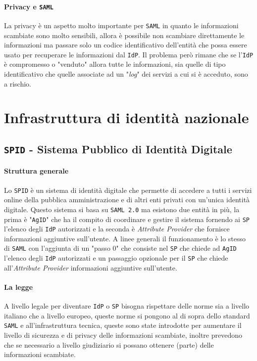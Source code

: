         \paragraph{Privacy e \texttt{SAML}} La privacy è un aspetto molto importante per \texttt{SAML} in quanto le informazioni scambiate sono molto sensibili, allora è possibile non scambiare direttamente le informazioni ma passare solo un codice identificativo dell'entità che possa essere usato per recuperare le informazioni dal \texttt{IdP}. Il problema però rimane che se l'\texttt{IdP} è compromesso o "venduto" allora tutte le informazioni, sia quelle di tipo identificativo che quelle associate ad un "\textit{log}" dei servizi a cui si è acceduto, sono a rischio.
\section{Infrastruttura di identità nazionale}
    \subsection{\texttt{SPID} - Sistema Pubblico di Identità Digitale}
        \paragraph{Struttura generale} Lo \texttt{SPID} è un sistema di identità digitale che permette di accedere a tutti i servizi online della pubblica amministrazione e di altri enti privati con un'unica identità digitale. Questo sistema si basa su \texttt{SAML 2.0} ma esistono due entità in più, la prima è "\texttt{AgID}" che ha il compito di coordinare e gestire il sistema fornendo ai \texttt{SP} l'elenco degli \texttt{IdP} autorizzati e la seconda è \textit{Attribute Provider} che fornisce informazioni aggiuntive sull'utente. A linee generali il funzionamento è lo stesso di \texttt{SAML} con l'aggiunta di un "passo 0" che consiste nel \texttt{SP} che chiede ad \texttt{AgID} l'elenco degli \texttt{IdP} autorizzati e un passaggio opzionale per il \texttt{SP} che chiede all'\textit{Attribute Provider} informazioni aggiuntive sull'utente.
        \paragraph{La legge} A livello legale per diventare \texttt{IdP} o \texttt{SP} bisogna rispettare delle norme sia a livello italiano che a livello europeo, queste norme si pongono al di sopra dello standard \texttt{SAML} e all'infrastruttura tecnica, queste sono state introdotte per aumentare il livello di sicurezza e di privacy delle informazioni scambiate, inoltre prevedono che se necessario a livello giudiziario si possano ottenere (parte) delle informazioni scambiate. 
